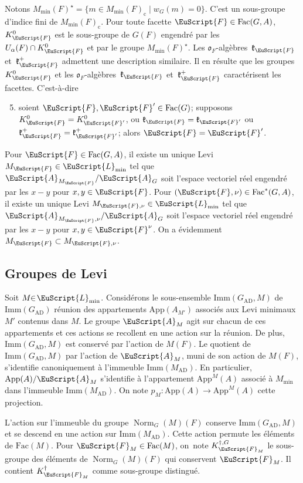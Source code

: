 \documentclass[JEP,XML,SOM,Unicode,francais]{cedram}
\let\mathcal \EuScript
\let\sep\mid
\newcommand{\frk}{\mathfrak{k}}
\newcommand{\fro}{\mathfrak{o}}
\newcommand{\AD}{\mathrm{AD}}
\newcommand{\App}{\mathrm{App}}
\newcommand{\rc}{\mathrm{c}}
\newcommand{\Fac}{\mathrm{Fac}}
\newcommand{\Imm}{\mathrm{Imm}}
\DeclareMathOperator{\Norm}{Norm}
\newcommand{\cA}{\mathcal{A}}
\newcommand{\cF}{\mathcal{F}}
\newcommand{\cL}{\mathcal{L}}
\theoremstyle{plain}
\theoremstyle{definition}
\begin{document}
Notons $M_{\min}(F)^{\star}=\{m\in M_{\min}(F)_{\rc}\sep w_{G}(m)=0\}$. C'est un sous-groupe d'indice fini de $M_{\min}(F)_{\rc}$. Pour toute facette $\cF\in \Fac(G,A)$, $K_{\cF}^0$ est le sous-groupe de $G(F)$ engendré par les $U_{\alpha}(F)\cap K_{\cF}^0$ et par le groupe $M_{\min}(F)^{\star}$. Les $\fro_{F}$-algèbres~$\frk_{\cF}$ et~$\frk_{\cF}^+$ admettent une description similaire. Il en résulte que
les groupes $K_{\cF}^0$ et les $\fro_{F}$-algèbres~$\frk_{\cF}$ et~$\frk_{\cF}^+$ caractérisent les facettes. C'est-à-dire
\begin{enumerate}\setcounter{enumi}{4}
\item\label{description5}
soient $\cF,\cF'\in \Fac(G)$; supposons $K_{\cF}^0=K_{\cF'}^0$, ou $\frk_{\cF}=\frk_{\cF'}$ ou $\frk^+_{\cF}=\frk^+_{\cF'}$; alors $\cF=\cF'$.
\end{enumerate}

Pour $\cF\in \Fac(G,A)$, il existe un unique Levi $M_{\cF}\in \cL_{\min}$ tel que $\cA_{M_{\cF}}/\cA_{G}$ soit l'espace vectoriel réel engendré par les $x-y$ pour $x,y\in \cF$. Pour $(\cF,\nu)\in \Fac^*(G,A)$, il existe un unique Levi $M_{\cF,\nu}\in \cL_{\min}$ tel que $\cA_{M_{\cF},\nu}/\cA_{G}$ soit l'espace vectoriel réel engendré par les $x-y$ pour $x,y\in \cF^{\nu}$. On a évidemment $M_{\cF}\subset M_{\cF,\nu}$.

\subsection{Groupes de Levi}\label{groupesdelevi}
Soit $M\!\!\in\!\cL_{\min}$. Considérons le sous-ensemble $\Imm(G_{\AD},M)$ de $\Imm(G_{\AD})$ réunion des appartements $\App(A_{M'})$ associés aux Levi minimaux $M'$ contenus dans $M$. Le groupe $\cA_{M}$ agit sur chacun de ces appartements et ces actions se recollent en une action sur la réunion. De plus, $\Imm(G_{\AD},M)$ est conservé par l'action de $M(F)$. Le quotient de $\Imm(G_{\AD},M)$ par l'action de $\cA_{M}$, muni de son action de $M(F)$, s'identifie canoniquement à l'immeuble $\Imm(M_{\AD})$. En particulier, $\App(A)/\cA_{M}$ s'identifie à l'appartement $\App^M(A)$ associé à $M_{\min}$ dans l'immeuble $\Imm(M_{\AD})$. On note $p_{M}:\App(A)\to \App^M(A)$ cette projection.

L'action sur l'immeuble du groupe $\Norm_{G}(M)(F)$ conserve $\Imm(G_{\AD},M)$ et se descend en une action sur $\Imm(M_{\AD})$. Cette action permute les éléments de $\Fac(M)$. Pour $\cF_{M}\in \Fac(M)$, on~note $K_{\cF_{M}}^{\dag,G}$ le sous-groupe des éléments de $\Norm_{G}(M)(F)$ qui conservent $\cF_{M}$. Il contient $K_{\cF_{M}}^{\dag}$ comme sous-groupe distingué.
\end{document}
